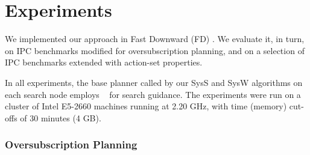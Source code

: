 

\newcommand{\scatterplotsize}{8cm}
\newcommand{\scatterplotxlabelshift}{1.5ex}
\newcommand{\scatterplotylabelshift}{-3ex}




\section{Experiments}
\label{experiments}

We implemented our approach in Fast Downward
(FD) \cite{helmert:jair-06}. We evaluate it, in turn, on IPC
benchmarks modified for oversubscription planning, and on a selection
of IPC benchmarks extended with action-set properties.

In all experiments, the base planner called by our SysS and SysW
algorithms on each search node
employs \hff\ \cite{hoffmann:nebel:jair-01} for search guidance.
%
%
The experiments were run on a cluster of Intel E5-2660 machines
running at 2.20 GHz, with time (memory) cut-offs of 30 minutes (4
GB).



 
\subsubsection*{Oversubscription Planning}

%

